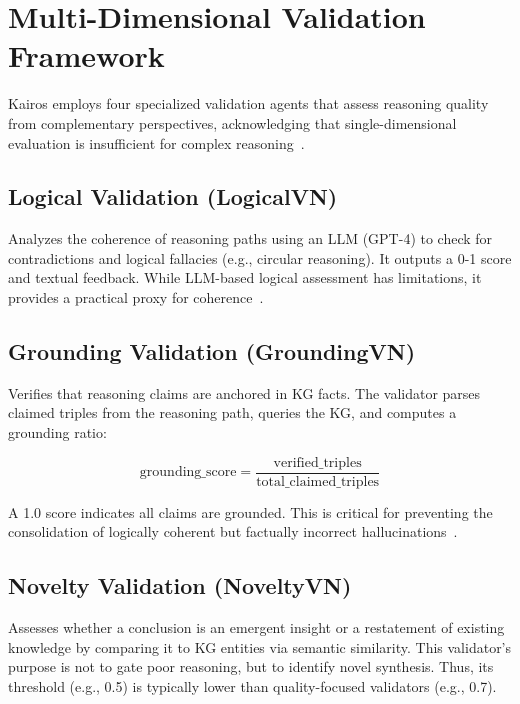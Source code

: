 \documentclass{article}
\begin{document}
\section{Multi-Dimensional Validation Framework}
\label{sec:validation}

Kairos employs four specialized validation agents that assess reasoning quality from complementary perspectives, acknowledging that single-dimensional evaluation is insufficient for complex reasoning~\citep{park2023generative,xu2025amem}.

\subsection{Logical Validation (LogicalVN)}

Analyzes the coherence of reasoning paths using an LLM (GPT-4) to check for contradictions and logical fallacies (e.g., circular reasoning). It outputs a 0-1 score and textual feedback. While LLM-based logical assessment has limitations, it provides a practical proxy for coherence~\citep{pan2024unifying}.

\subsection{Grounding Validation (GroundingVN)}

Verifies that reasoning claims are anchored in KG facts. The validator parses claimed triples from the reasoning path, queries the KG, and computes a grounding ratio:

\begin{equation}
\text{grounding\_score} = \frac{\text{verified\_triples}}{\text{total\_claimed\_triples}}
\end{equation}

A 1.0 score indicates all claims are grounded. This is critical for preventing the consolidation of logically coherent but factually incorrect hallucinations~\citep{edge2024graphrag}.

\subsection{Novelty Validation (NoveltyVN)}

Assesses whether a conclusion is an emergent insight or a restatement of existing knowledge by comparing it to KG entities via semantic similarity. This validator's purpose is not to gate poor reasoning, but to identify novel synthesis. Thus, its threshold (e.g., 0.5) is typically lower than quality-focused validators (e.g., 0.7).
\end{document}
